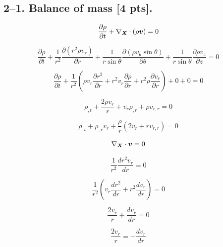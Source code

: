 \documentclass{article}
\begin{document}
\subsection*{2--1. \textbf{Balance of mass} [4 pts].}

\begin{equation*}
    \frac{\partial \rho}{\partial t} + \nabla_{\bm{X}} \cdot (\rho \bm{v}) = 0
\end{equation*}

\begin{equation*}
    \frac{\partial \rho}{\partial t} + \frac{1}{r^2} \frac{\partial (r^2 \rho v_r)}{\partial r} + \frac{1}{r \sin \theta} \frac{\partial (\rho v_\theta \sin \theta)}{\partial \theta} + \frac{1}{r \sin \theta} \frac{\partial \rho v_z}{\partial z} = 0
\end{equation*}

\begin{equation*}
    \frac{\partial \rho}{\partial t} + \frac{1}{r^2} (\rho v_r \frac{\partial r^2}{\partial r}+ r^2v_r \frac{\partial \rho}{\partial r} + r^2 \rho \frac{\partial v_r}{\partial r}) + 0 + 0 = 0
\end{equation*}

\begin{equation*}
    \rho_{,t} + \frac{2 \rho v_r}{r} + v_r \rho_{,r} + \rho v_{r,r} = 0
\end{equation*}

\begin{equation*}
    \rho_{,t} + \rho_{,r} v_r + \frac{\rho}{r}(2v_r + r v_{r,r}) = 0
\end{equation*}

\newpage


\begin{equation*}
    \nabla_{\bm{X}} \cdot \bm{v} = 0
\end{equation*}

\begin{equation*}
    \frac{1}{r^2} \frac{d r^2 v_r}{d r} = 0
\end{equation*}

\begin{equation*}
    \frac{1}{r^2} (v_r \frac{d r^2}{d r} + r^2 \frac{d v_r}{d r}) = 0
\end{equation*}

\begin{equation*}
    \frac{2v_r}{r} + \frac{d v_r}{d r} = 0
\end{equation*}

\begin{equation*}
    \frac{2v_r}{r} = - \frac{d v_r}{d r}
\end{equation*}
\end{document}
